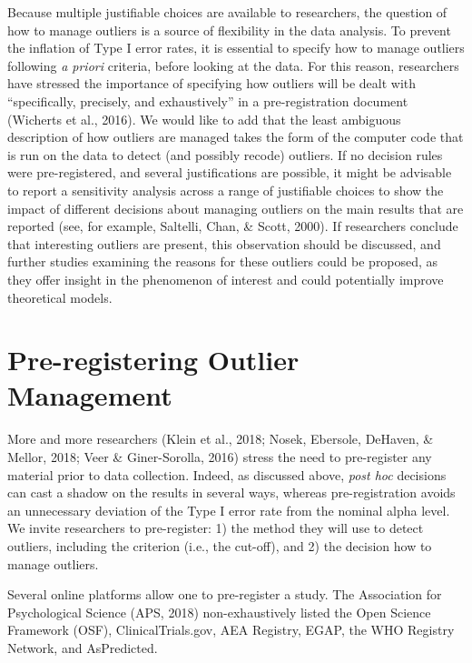 \documentclass[man,floatsintext]{apa6}
\begin{document}
Because multiple justifiable choices are available to researchers, the
question of how to manage outliers is a source of flexibility in the
data analysis. To prevent the inflation of Type I error rates, it is
essential to specify how to manage outliers following \emph{a priori}
criteria, before looking at the data. For this reason, researchers have
stressed the importance of specifying how outliers will be dealt with
\enquote{specifically, precisely, and exhaustively} in a
pre-registration document (Wicherts et al., 2016). We would like to add
that the least ambiguous description of how outliers are managed takes
the form of the computer code that is run on the data to detect (and
possibly recode) outliers. If no decision rules were pre-registered, and
several justifications are possible, it might be advisable to report a
sensitivity analysis across a range of justifiable choices to show the
impact of different decisions about managing outliers on the main
results that are reported (see, for example, Saltelli, Chan, \& Scott,
2000). If researchers conclude that interesting outliers are present,
this observation should be discussed, and further studies examining the
reasons for these outliers could be proposed, as they offer insight in
the phenomenon of interest and could potentially improve theoretical
models.

\section{Pre-registering Outlier
Management}\label{pre-registering-outlier-management}

More and more researchers (Klein et al., 2018; Nosek, Ebersole, DeHaven,
\& Mellor, 2018; Veer \& Giner-Sorolla, 2016) stress the need to
pre-register any material prior to data collection. Indeed, as discussed
above, \emph{post hoc} decisions can cast a shadow on the results in
several ways, whereas pre-registration avoids an unnecessary deviation
of the Type I error rate from the nominal alpha level. We invite
researchers to pre-register: 1) the method they will use to detect
outliers, including the criterion (i.e., the cut-off), and 2) the
decision how to manage outliers.

Several online platforms allow one to pre-register a study. The
Association for Psychological Science (APS, 2018) non-exhaustively
listed the Open Science Framework (OSF), ClinicalTrials.gov, AEA
Registry, EGAP, the WHO Registry Network, and AsPredicted.
\end{document}
